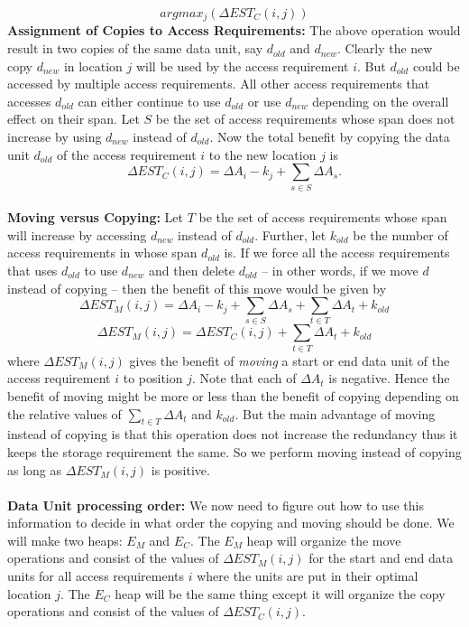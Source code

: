 \[
argmax_j(\Delta EST_C(i,j))
\]
{\bf Assignment of Copies to Access Requirements:} The above operation would result in two copies of the same data unit, say $d_{old}$ and $d_{new}$. Clearly the new copy $d_{new}$ in location $j$ will be used by the access requirement $i$.  But $d_{old}$ could be accessed by
multiple access requirements. All other access requirements that accesses $d_{old}$ can either continue to use $d_{old}$ or use $d_{new}$ depending on the overall effect on their span. Let $S$ be the set of access requirements whose span does not increase by using $d_{new}$ instead of $d_{old}$. Now the total benefit by copying the data unit $d_{old}$ of the access requirement $i$ to the new location $j$ is
\begin{equation}
\Delta EST_C(i,j) = \Delta A_i - k_j + \sum_{s\in S}\Delta{A_s}.
\label{eq:copyingcost}
\end{equation}
\\
{\bf Moving versus Copying:} Let $T$ be the set of access requirements whose span will increase by accessing $d_{new}$ instead of $d_{old}$. Further, let $k_{old}$ be the number of access requirements in whose span $d_{old}$ is. If we force all the access requirements that uses $d_{old}$ to use $d_{new}$ and then delete $d_{old}$ -- in other words, if we move $d$ instead of copying -- then the benefit of this move would be given by
\[
 \Delta EST_M(i,j) = \Delta A_i - k_j + \sum_{s\in S}\Delta{A_s} + \sum_{t\in T}\Delta{A_t} + k_{old}
\]
\[
 \Delta EST_M(i,j) = \Delta EST_C(i,j) + \sum_{t\in T}\Delta{A_t} + k_{old}
\]
where $\Delta EST_M(i,j)$ gives the benefit of {\it moving} a start or end data unit of the access requirement $i$ to position $j$. Note that each of $\Delta A_t$ is negative. Hence the benefit of moving might be more or less than the benefit of copying depending on the relative values of $\sum_{t\in T}\Delta{A_t}$ and $k_{old}$. But the main advantage of moving instead of copying is that this operation does not increase the redundancy thus it keeps the storage requirement the same. So we perform moving instead of copying as long as $\Delta EST_M(i,j)$ is positive.\\
\\
{\bf Data Unit processing order:} We now need to figure out how to use this
information to decide in what order the copying and moving should be done. We will make two heaps: $E_M$ and $E_C$. The $E_M$ heap will organize the move operations and consist of the values of $\Delta EST_M(i,j)$ for the start and end data units for all access requirements $i$ where the units are put in their optimal location $j$. The $E_C$ heap will be the same thing except it will organize the copy operations and consist of the values of $\Delta EST_C(i,j)$.\\
